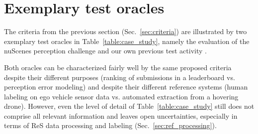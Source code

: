 \documentclass[conference]{IEEEtran}
\begin{document}



\section{Exemplary test oracles}
\label{sec:case_studies}


The criteria from the previous section (Sec.~\ref{sec:criteria}) are illustrated by two exemplary test oracles in Table~\ref{table:case_study}, namely the evaluation of the nuScenes perception challenge \cite{caesar2019nuscenes} and our own previous test activity \cite{Krajewski2020UsingDrones}. 


Both oracles can be characterized fairly well by the same proposed criteria despite their different purposes (ranking of submissions in a leaderboard vs. perception error modeling) and despite their different reference systems (human labeling on ego vehicle sensor data vs. automated extraction from a hovering drone).
However, even the level of detail of Table~\ref{table:case_study} still does not comprise all relevant information and leaves open uncertainties, especially in terms of ReS data processing and labeling (Sec.~\ref{sec:ref_processing}).






\end{document}
